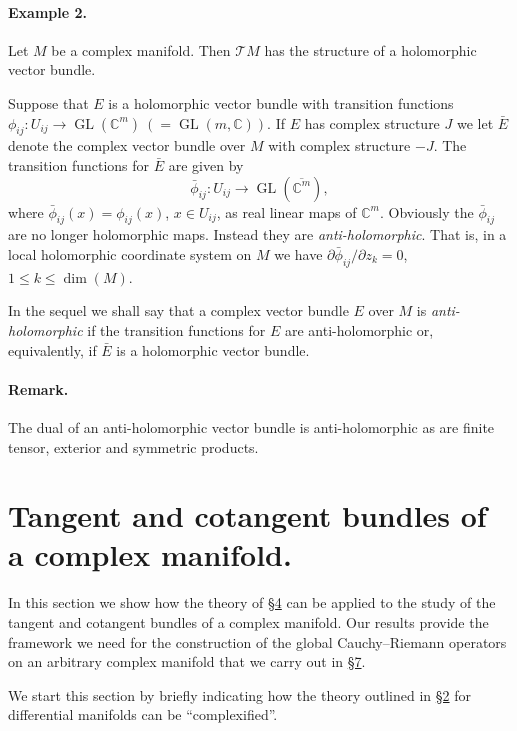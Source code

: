 \paragraph{Example 2.} Let $M$ be a complex manifold. Then $\mathcal TM$ has the structure of a holomorphic vector bundle.

Suppose that $E$ is a holomorphic vector bundle with transition functions $\phi_{ij}:U_{ij}\to\operatorname{GL}(\mathbb C^m)\ (=\operatorname{GL}(m,\mathbb C))$. If $E$ has complex structure $J$ we let $\bar E$ denote the complex vector bundle over $M$ with complex structure $-J$. The transition functions for $\bar E$ are given by
\[\bar\phi_{ij}:U_{ij}\to\operatorname{GL}(\overline{\mathbb C^m}),\]
where $\bar\phi_{ij}(x)=\phi_{ij}(x)$, $x\in U_{ij}$, as real linear maps of $\mathbb C^m$. Obviously the $\bar\phi_{ij}$ are no longer holomorphic maps. Instead they are \emph{anti-holomorphic}. That is, in a local holomorphic coordinate system on $M$ we have $\partial\bar\phi_{ij}/\partial z_k=0$, $1\leq k\leq\dim(M)$.

In the sequel we shall say that a complex vector bundle $E$ over $M$ is \emph{anti-holomorphic} if the transition functions for $E$ are anti-holomorphic or, equivalently, if $\bar E$ is a holomorphic vector bundle.
\paragraph{Remark.} The dual of an anti-holomorphic vector bundle is anti-holomorphic as are finite tensor, exterior and symmetric products.
\section{Tangent and cotangent bundles of a complex manifold.}\label{sec:5:6}
In this section we show how the theory of \hyperref[sec:5:4]{\S4} can be applied to the study of the tangent and cotangent bundles of a complex manifold. Our results provide the framework we need for the construction of the global Cauchy--Riemann operators on an arbitrary complex manifold that we carry out in \hyperref[sec:5:7]{\S7}.

We start this section by briefly indicating how the theory outlined in \hyperref[sec:5:2]{\S2} for differential manifolds can be ``complexified''.

